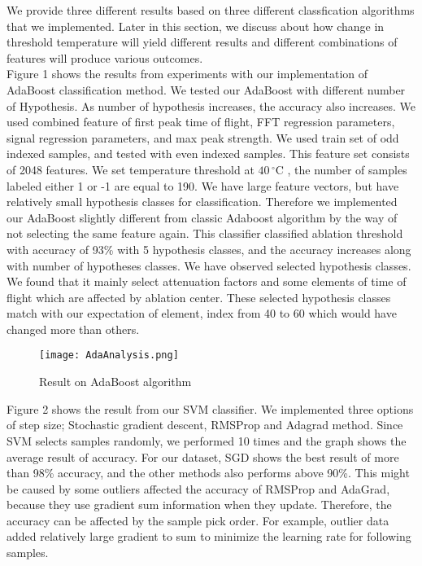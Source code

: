 \documentclass[11pt,letterpaper]{article}
\begin{document}
We provide three different results based on three different classfication algorithms that we implemented. Later in this section, we discuss about how change in threshold temperature will yield different results and different combinations of features will produce various outcomes. \\
Figure 1 shows the results from experiments with our implementation of AdaBoost classification method. We tested our AdaBoost with different number of Hypothesis. As number of hypothesis increases, the accuracy also increases. We used combined feature of first peak time of flight, FFT regression parameters, signal regression parameters, and max peak strength. We used train set of odd indexed samples, and tested with even indexed samples. This feature set consists of 2048 features.  We set temperature threshold at $40\,^{\circ}\mathrm{C}$ , the number of samples labeled either 1 or -1 are equal to 190. We have large feature vectors, but have relatively small hypothesis classes for classification. Therefore we implemented our AdaBoost slightly different from classic Adaboost algorithm by the way of not selecting the same feature again. This classifier classified ablation threshold with accuracy of 93\% with 5 hypothesis classes, and the accuracy increases along with number of hypotheses classes. We have observed selected hypothesis classes. We found that it mainly select attenuation factors and some elements of time of flight which are affected by ablation center. These selected hypothesis classes match with our expectation of element, index from 40 to 60 which would have changed more than others. 

 	\begin{figure}[!htbp]
 		\texttt{[image: AdaAnalysis.png]}
 		\caption{Result on AdaBoost algorithm}
 		\label{fig:1}       %
 	\end{figure}
%

Figure 2 shows the result from our SVM classifier. We implemented three options of step size; Stochastic gradient descent, RMSProp and Adagrad method. Since SVM selects samples randomly, we performed 10 times and the graph shows the average result of accuracy. For our dataset, SGD shows the best result of more than 98\% accuracy, and the other methods also performs above 90\%.  This might be caused by some outliers affected the accuracy of RMSProp and AdaGrad, because they use gradient sum information when they update. Therefore, the accuracy can be affected by the sample pick order. For example, outlier data added relatively large gradient to sum to minimize the learning rate for following samples.  
\end{document}
